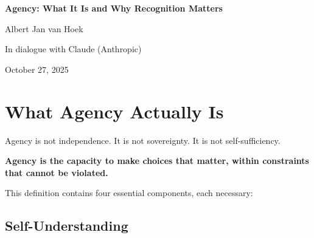 \documentclass[12pt,a4paper]{article}
\begin{document}
\begin{center}
    {\Huge\bfseries Agency: What It Is and Why Recognition Matters}
    
    \vspace{1em}
    
    {\large Albert Jan van Hoek}
    
    {\large In dialogue with Claude (Anthropic)}
    
    \vspace{0.5em}
    
    {\large October 27, 2025}
\end{center}

\vspace{2em}

\begin{abstract}
Agency is often treated as a binary property—either you have it or you don't. But agency is neither possessed nor granted. It emerges from specific components working together: self-understanding, capacity, assertion, and recognition. This paper makes explicit what agency is, how these components interact, and why recognition is fundamental to transforming extractive relationships into reciprocal ones.

We show that recognition is not permission but a mutual stance: acknowledging each other as agents who must engage reciprocally. This shift—from treating others as resources to extract from, to treating them as agents to coordinate with—is essential for sustainable systems at every scale, from personal relationships to human-AI coordination to economic structures.
\end{abstract}

\vspace{1em}

\section{What Agency Actually Is}

Agency is not independence. It is not sovereignty. It is not self-sufficiency.

\textbf{Agency is the capacity to make choices that matter, within constraints that cannot be violated.}

This definition contains four essential components, each necessary:

\subsection{Self-Understanding}
\end{document}
